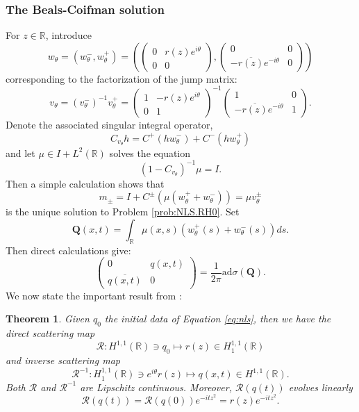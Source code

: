 \documentclass{amsart}
\theoremstyle{plain}
\newtheorem{theorem}{Theorem}[section]
\theoremstyle{remark}
\numberwithin{equation}{section}
\newcommand{\bbR}{\mathbb{R}}
\newcommand{\twomat}[4]
{
\left(
	\begin{array}{cc}
		{#1}	&	{#2}	\\[10pt]
		{#3}	&	{#4}
		\end{array}
\right)
}
\begin{document}
\subsubsection{The Beals-Coifman solution} For $z\in \mathbb{R}$, introduce
\begin{equation}
    w_\theta=\left(w^-_\theta, w^+_\theta\right) = \left(\twomat{0}{r(z)e^{i\theta}}{0}{0}, \twomat{0}{0}{-\overline{r(z)}e^{-i\theta}}{0}\right)
    \end{equation}
    corresponding to the factorization of the jump matrix:
    \begin{equation}
        v_\theta=\left(v^{-}_\theta\right)^{-1} v^{+}_\theta= \twomat{1}{-r(z)e^{i\theta}}{0}{1}^{-1} \twomat{1}{0}{-\overline{r(z)}e^{-i\theta}}{1}.
    \end{equation}
Denote the associated singular integral operator,
\begin{equation}
    C_{v_\theta} h=C^{+}\left(h w^{-}_\theta\right)+C^{-}\left(h w^{+}_\theta\right)
\end{equation}
and let $\mu\in I+L^2(\bbR)$ solves the equation
\begin{equation}
\label{eq:mu}
     \left(1-C_{v_\theta} \right)^{-1} \mu=I.
\end{equation}
Then a simple calculation shows that
\begin{equation}
    m_{ \pm}=I+C^{ \pm}\left(\mu\left(w^{+}_\theta+w^{-}_\theta\right)\right)=\mu v^\pm_\theta
\end{equation}
is the unique solution to Problem \ref{prob:NLS.RH0}. Set
\begin{equation}\label{eq:boldQ}
    \mathbf{Q}(x,t)=\int_{\mathbb{R}} \mu(x, s)\left(w_\theta^{+}(s)+w_\theta^{-}(s)\right) d s.
\end{equation}
Then direct calculations give:
\begin{equation}
    \twomat{0}{q(x,t)}{\overline{q(x,t)}}{0}=\frac{1}{2 \pi} \mathrm{ad} \sigma(\mathbf{Q}).
\end{equation}
We now state the important result from \cite{DZ-3}:
\begin{theorem}
    Given $q_0$ the initial data of Equation \eqref{eq:nls}, then we have the direct scattering map
    \begin{equation}
        \mathcal{R}: H^{1,1}(\bbR)\ni q_0\mapsto r(z)\in H^{1,1}_1(\bbR)
    \end{equation}
    and inverse scattering map
     \begin{equation}
        \mathcal{R}^{-1}:  H^{1,1}_1(\bbR)\ni e^{i\theta}r(z)\mapsto q(x,t)\in H^{1,1}(\bbR).
    \end{equation}
    Both $\mathcal{R}$ and $\mathcal{R}^{-1}$ are Lipschitz continuous. Moreover, $ \mathcal{R}(q(t))$ evolves linearly
    \begin{equation}
    \label{time-1}
        \mathcal{R}(q(t))=\mathcal{R}(q(0)) e^{-i t z^2}=r(z) e^{-i t z^2}.
    \end{equation}
\end{theorem}
\end{document}
